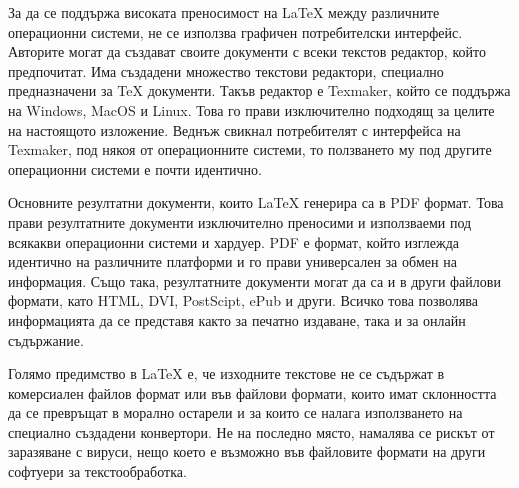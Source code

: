 За да се поддържа високата преносимост на LaTeX между различните операционни системи, не се използва графичен потребителски интерфейс. Авторите могат да създават своите документи с всеки текстов редактор, който предпочитат. Има създадени множество текстови редактори, специално предназначени за TeX документи. Такъв редактор е Texmaker, който се поддържа на Windows, MacOS и Linux. Това го прави изключително подходящ за целите на настоящото изложение. Веднъж свикнал потребителят с интерфейса на Texmaker, под някоя от операционните системи, то ползването му под другите операционни системи е почти идентично. 

Основните резултатни документи, които LaTeX генерира са в PDF формат. Това прави резултатните документи изключително преносими и използваеми под всякакви операционни системи и хардуер. PDF е формат, който изглежда идентично на различните платформи и го прави универсален за обмен на информация. Също така, резултатните документи могат да са и в други файлови формати, като HTML, DVI, PostScipt, ePub и други. Всичко това позволява информацията да се представя както за печатно издаване, така и за онлайн съдържание.

Голямо предимство в LaTeX е, че изходните текстове не се съдържат в комерсиален файлов формат или във файлови формати, които имат склонността да се превръщат в морално остарели и за които се налага използването на специално създадени конвертори. Не на последно място, намалява се рискът от заразяване с вируси, нещо което е възможно във файловите формати на други софтуери за текстообработка.


